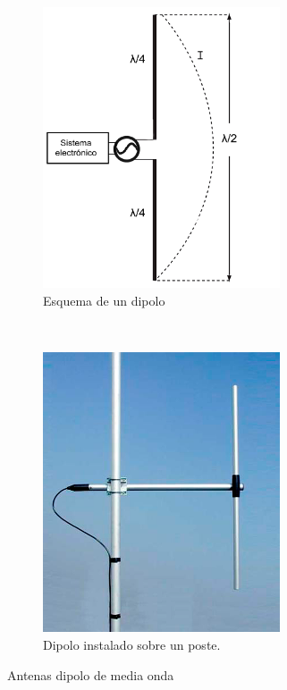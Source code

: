 \begin{figure}[h]
\centering
	\begin{subfigure}[b]{0.4\textwidth} %
		\centering
		\includegraphics[width=7cm]{archivos/dipolo/dipole1} %
		\caption{Esquema de un dipolo}
		\label{fig:dipolo1}
	\end{subfigure}
~ %
	\begin{subfigure}[b]{0.4\textwidth} %
	\centering
		\includegraphics[width=7cm]{archivos/dipolo/dipole2} %
		\caption{Dipolo instalado sobre un poste. \citep{Sirio2012}}
		\label{fig:dipolo2}
	\end{subfigure}
\caption{Antenas dipolo de media onda}\label{fig:dipolo}
\end{figure}

